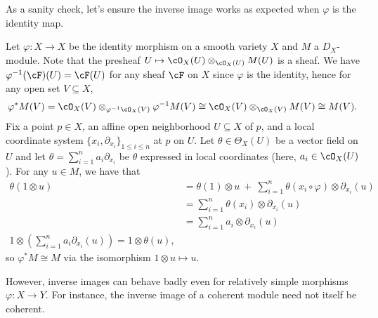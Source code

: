 As a sanity check, let's ensure the inverse image works as expected when $\varphi$ is the identity map.
\begin{example}\label{example:inv-img-sanity-check}
	Let $\varphi:X\to X$ be the identity morphism on a smooth variety $X$ and $M$ a $D_X$-module. Note that the presheaf $U\mapsto \cO_X(U)\otimes_{\cO_X(U)} M(U)$ is a sheaf. We have $\varphi^{-1}(\cF)(U) = \cF(U)$ for any sheaf $\cF$ on $X$ since $\varphi$ is the identity, hence for any open set $V \subseteq X$,
	\begin{align*}
		\varphi^*M(V) = \cO_X(V)\otimes_{\varphi^{-1}\cO_X(V)} \varphi^{-1}M(V) \cong \cO_X(V) \otimes_{\cO_X(V)} M(V) \cong M(V).
	\end{align*}
	Fix a point $p \in X$, an affine open neighborhood $U \subseteq X$ of $p$, and a local coordinate system $\{x_i,\partial_{x_i}\}_{1\leq i\leq n}$ at $p$ on $U$. Let $\theta \in \Theta_X(U)$ be a vector field on $U$ and let $\theta = \sum_{i=1}^n a_i\partial_{x_i}$ be $\theta$ expressed in local coordinates (here, $a_i \in \cO_X(U)$). For any $u \in M$, we have that
	\begin{align*}
		\theta(1\otimes u)
		&= \theta(1)\otimes u ~+~ \sum_{i=1}^n\theta(x_i\circ \varphi)\otimes \partial_{x_i}(u) \\
		&= \sum_{i=1}^n \theta(x_i)\otimes \partial_{x_i}(u) \\
		&= \sum_{i=1}^n a_i\otimes \partial_{x_i}(u) \\
		1 \otimes \left(\sum_{i=1}^n a_i\partial_{x_i}(u)\right) = 1\otimes \theta(u),
	\end{align*}
	so $\varphi^*M \cong M$ via the isomorphism $1\otimes u\mapsto u$.
\end{example}
However, inverse images can behave badly even for relatively simple morphisms $\varphi:X\to Y$. For instance, the inverse image of a coherent module need not itself be coherent. 

